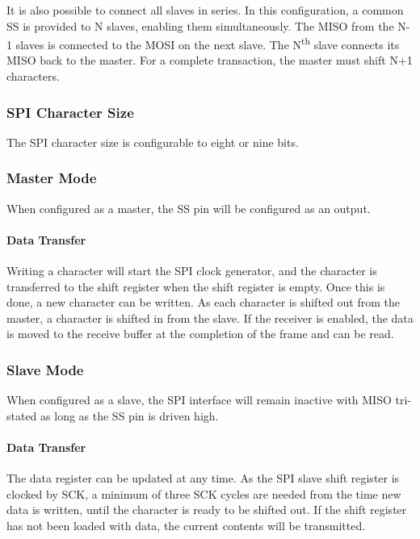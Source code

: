 It is also possible to connect all slaves in series. In this configuration, a common SS is provided to {\ttfamily N} slaves, enabling them simultaneously. The M\+I\+SO from the {\ttfamily N-\/1} slaves is connected to the M\+O\+SI on the next slave. The {\ttfamily N\textsuperscript{th}} slave connects its M\+I\+SO back to the master. For a complete transaction, the master must shift {\ttfamily N+1} characters.\hypertarget{group__asfdoc__sam0__sercom__spi__group_asfdoc_sam0_sercom_spi_chsize}{}\subsubsection{S\+P\+I Character Size}\label{group__asfdoc__sam0__sercom__spi__group_asfdoc_sam0_sercom_spi_chsize}
The S\+PI character size is configurable to eight or nine bits.\hypertarget{group__asfdoc__sam0__sercom__spi__group_asfdoc_sam0_sercom_spi_master_mode}{}\subsubsection{Master Mode}\label{group__asfdoc__sam0__sercom__spi__group_asfdoc_sam0_sercom_spi_master_mode}
When configured as a master, the SS pin will be configured as an output.\hypertarget{group__asfdoc__sam0__sercom__spi__group_asfdoc_sam0_sercom_spi_master_mode_data_transfer}{}\paragraph{Data Transfer}\label{group__asfdoc__sam0__sercom__spi__group_asfdoc_sam0_sercom_spi_master_mode_data_transfer}
Writing a character will start the S\+PI clock generator, and the character is transferred to the shift register when the shift register is empty. Once this is done, a new character can be written. As each character is shifted out from the master, a character is shifted in from the slave. If the receiver is enabled, the data is moved to the receive buffer at the completion of the frame and can be read.\hypertarget{group__asfdoc__sam0__sercom__spi__group_asfdoc_sam0_sercom_spi_slave_mode}{}\subsubsection{Slave Mode}\label{group__asfdoc__sam0__sercom__spi__group_asfdoc_sam0_sercom_spi_slave_mode}
When configured as a slave, the S\+PI interface will remain inactive with M\+I\+SO tri-\/stated as long as the SS pin is driven high.\hypertarget{group__asfdoc__sam0__sercom__spi__group_asfdoc_sam0_sercom_spi_slave_mode_data_transfer_slave}{}\paragraph{Data Transfer}\label{group__asfdoc__sam0__sercom__spi__group_asfdoc_sam0_sercom_spi_slave_mode_data_transfer_slave}
The data register can be updated at any time. As the S\+PI slave shift register is clocked by S\+CK, a minimum of three S\+CK cycles are needed from the time new data is written, until the character is ready to be shifted out. If the shift register has not been loaded with data, the current contents will be transmitted.

